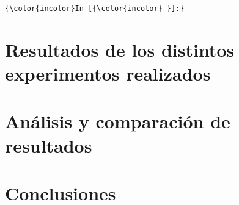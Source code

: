 \documentclass[11pt]{article}
\begin{document}
    \begin{Verbatim}[commandchars=\\\{\}]
{\color{incolor}In [{\color{incolor} }]:} 
\end{Verbatim}

    \section{Resultados de los distintos experimentos
realizados}\label{resultados-de-los-distintos-experimentos-realizados}

\section{Análisis y comparación de
resultados}\label{anuxe1lisis-y-comparaciuxf3n-de-resultados}

\section{Conclusiones}\label{conclusiones}


    
    
    
    
\end{document}
